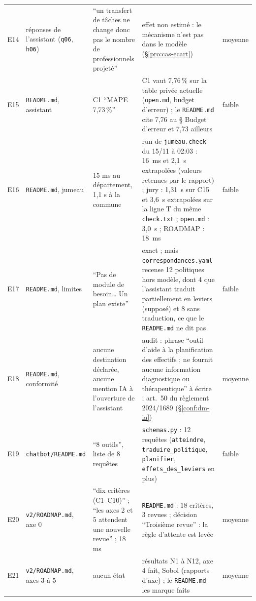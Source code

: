 \begin{small}
\begin{longtable}{@{}p{}p{}p{}p{}p{}@{}}
E14 & réponses de l'assistant (\texttt{q06}, \texttt{h06}) & \enquote{un transfert de tâches ne change donc pas le nombre de professionnels projeté} & effet non estimé : le mécanisme n'est pas dans le modèle (§\ref{pro:cas-ecart}) & moyenne \\
E15 & \texttt{README.md}, assistant & C1 \enquote{MAPE 7,73\,\%} & C1 vaut 7,76\mesure{}\,\% sur la table privée actuelle (\texttt{open.md}, budget d'erreur) ; le \texttt{README.md} cite 7,76 au § Budget d'erreur et 7,73 ailleurs & faible \\
E16 & \texttt{README.md}, jumeau & 15 ms au département, 1,1 s à la commune & run de \texttt{jumeau.check} du 15/11 à 02:03 : 16\mesure{}~ms et 2,1\derive{}~s extrapolées (valeurs retenues par le rapport) ; jury : 1,31\mesure{}~s sur C15 et 3,6\derive{}~s extrapolées sur la ligne T du même \texttt{check.txt} ; \texttt{open.md} : 3,0\derive{}~s ; ROADMAP : 18\mesure{}~ms & faible \\
E17 & \texttt{README.md}, limites & \enquote{Pas de module de besoin\ldots{} Un plan existe} & exact ; mais \texttt{correspondances.yaml} recense 12\mesure{} politiques hors modèle, dont 4\mesure{} que l'assistant traduit partiellement en leviers (supposé) et 8\mesure{} sans traduction, ce que le \texttt{README.md} ne dit pas & faible \\
E18 & \texttt{README.md}, conformité & aucune destination déclarée, aucune mention IA à l'ouverture de l'assistant & audit : phrase \enquote{outil d'aide à la planification des effectifs ; ne fournit aucune information diagnostique ou thérapeutique} à écrire ; art.~50 du règlement 2024/1689 (§\ref{conf:dm-ia}) & moyenne \\
E19 & \texttt{chatbot/\allowbreak{}README.md} & \enquote{8 outils}, liste de 8 requêtes & \texttt{schemas.py} : 12\mesure{} requêtes (\texttt{atteindre}, \texttt{traduire\_\allowbreak{}politique}, \texttt{planifier}, \texttt{effets\_\allowbreak{}des\_\allowbreak{}leviers} en plus) & faible \\
E20 & \texttt{v2/\allowbreak{}ROADMAP.md}, axe 0 & \enquote{dix critères (C1--C10)} ; \enquote{les axes 2 et 5 attendent une nouvelle revue} ; 18 ms & \texttt{README.md} : 18\mesure{} critères, 3 revues ; décision \enquote{Troisième revue} : la règle d'attente est levée & moyenne \\
E21 & \texttt{v2/\allowbreak{}ROADMAP.md}, axes 3 à 5 & aucun état & résultats N1 à N12, axe 4 fait, Sobol (rapports d'axe) ; le \texttt{README.md} les marque faits & moyenne \\

\end{longtable}
\end{small}
